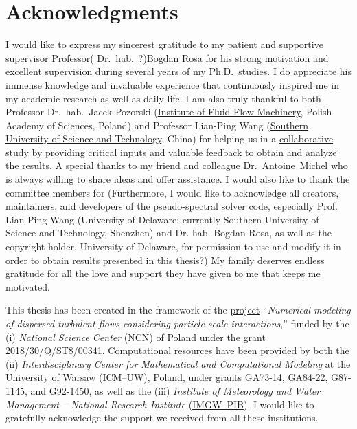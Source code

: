 \documentclass[../thesis.tex]{subfiles}
\begin{document}
\section*{Acknowledgments\label{sec:ack}}

I would like to express my sincerest gratitude to my patient and supportive supervisor Professor( Dr.\ hab.\ ?)Bogdan Rosa for his strong motivation and excellent supervision during several years of my Ph.D.\ studies. I do appreciate his immense knowledge and invaluable experience that continuously inspired me in my academic research as well as daily life. I am also truly thankful to both Professor Dr.\ hab.\ Jacek Pozorski (\href{https://www.imp.gda.pl/en/}{Institute of Fluid-Flow Machinery}, Polish Academy of Sciences, Poland) and Professor Lian-Ping Wang (\href{https://www.sustech.edu.cn/en/}{Southern University of Science and Technology}, China) for helping us in a \href{https://doi.org/10.1017/jfm.2021.229}{collaborative study} by providing critical inputs and valuable feedback to obtain and analyze the results. A special thanks to my friend and colleague \mbox{Dr.\ Antoine Michel} who is always willing to share ideas and offer assistance. I would also like to thank the committee members for
(Furthermore, I would like to acknowledge all creators, maintainers, and developers of the pseudo-spectral solver code, especially Prof. Lian-Ping Wang (University of Delaware; currently Southern University of Science and Technology, Shenzhen) and Dr. hab. Bogdan Rosa, as well as the copyright holder, University of Delaware, for permission to use and modify it in order to obtain results presented in this thesis?)
My family deserves endless gratitude for all the love and support they have given to me that keeps me motivated. 

This thesis has been created in the framework of the \href{https://projekty.ncn.gov.pl/en/index.php?projekt_id=417540}{project} ``\emph{Numerical modeling of dispersed turbulent flows considering particle-scale interactions},'' funded by the (i) \textsl{National Science Center} (\href{https://www.ncn.gov.pl/en}{NCN}) of Poland under the grant \mbox{2018/30/Q/ST8/00341}. Computational resources have been provided by both the (ii) \textsl{Interdisciplinary Center for Mathematical and Computational Modeling} at the University of Warsaw (\href{https://icm.edu.pl/en/}{ICM--UW}), Poland, under grants \mbox{GA73-14}, \mbox{GA84-22}, \mbox{G87-1145}, and \mbox{G92-1450}, as well as the (iii) \textsl{Institute of Meteorology and Water Management -- National Research Institute} (\href{https://www.imgw.pl/}{IMGW--PIB}). I would like to gratefully acknowledge the support we received from all these institutions.

\newpage
\end{document}
